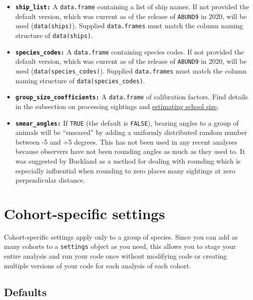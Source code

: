 \documentclass[
]{book}
\begin{document}
\begin{itemize}
\item
  \textbf{\texttt{ship\_list:}} A \texttt{data.frame} containing a list of ship names. If not provided the default version, which was current as of the release of \texttt{ABUND9} in 2020, will be used (\texttt{data(ships)}). Supplied \texttt{data.frames} must match the column naming structure of \texttt{data(ships)}.
\item
  \textbf{\texttt{species\_codes:}} A \texttt{data.frame} containing species codes. If not provided the default version, which was current as of the release of \texttt{ABUND9} in 2020, will be used (\texttt{data(species\_codes)}). Supplied \texttt{data.frames} must match the column naming structure of \texttt{data(species\_codes)}.
\item
  \textbf{\texttt{group\_size\_coefficients:}} A \texttt{data.frame} of calibration factors. Find details in the subsection on processing sightings and \protect\hyperlink{ss_calibration}{estimating school size}.
\item
  \textbf{\texttt{smear\_angles:}} If \texttt{TRUE} (the default is \texttt{FALSE}), bearing angles to a group of animals will be ``smeared'' by adding a uniformly distributed random number between -5 and +5 degrees. This has not been used in any recent analyses because observers have not been rounding angles as much as they used to. It was suggested by Buckland as a method for dealing with rounding which is especially influential when rounding to zero places many sightings at zero perpendicular distance.
\end{itemize}

\hypertarget{cohort-specific-settings}{%
\section*{Cohort-specific settings}\label{cohort-specific-settings}}

Cohort-specific settings apply only to a group of species. Since you can add as many cohorts to a \texttt{settings} object as you need, this allows you to stage your entire analysis and run your code once without modifying code or creating multiple versions of your code for each analysis of each cohort.

\hypertarget{defaults-1}{%
\subsection*{Defaults}\label{defaults-1}}
\end{document}
